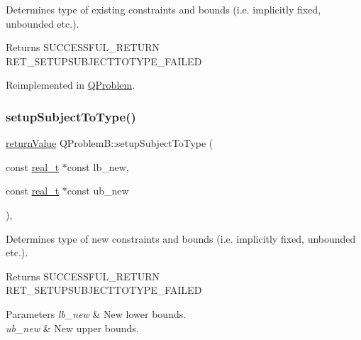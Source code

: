 Determines type of existing constraints and bounds (i.\+e. implicitly fixed, unbounded etc.). \begin{DoxyReturn}{Returns}
S\+U\+C\+C\+E\+S\+S\+F\+U\+L\+\_\+\+R\+E\+T\+U\+RN ~\newline
 R\+E\+T\+\_\+\+S\+E\+T\+U\+P\+S\+U\+B\+J\+E\+C\+T\+T\+O\+T\+Y\+P\+E\+\_\+\+F\+A\+I\+L\+ED 
\end{DoxyReturn}


Reimplemented in \hyperlink{class_q_problem_af024ebec53f988671f24ee98e71394a1}{Q\+Problem}.

\mbox{\label{class_q_problem_b_a9b170181bd826023ce43c3df3ff463e7}} 
\subsubsection{\texorpdfstring{setup\+Subject\+To\+Type()}{setupSubjectToType()}\hspace{0.1cm}{\footnotesize\ttfamily [2/2]}}
{\footnotesize\ttfamily \hyperlink{_message_handling_8hpp_a81d556f613bfbabd0b1f9488c0fa865e}{return\+Value} Q\+Problem\+B\+::setup\+Subject\+To\+Type (\begin{DoxyParamCaption}\item[{const \hyperlink{qp_o_a_s_e_s__wrapper_8h_a0d00e2b3dfadee81331bbb39068570c4}{real\+\_\+t} $\ast$const}]{lb\+\_\+new,  }\item[{const \hyperlink{qp_o_a_s_e_s__wrapper_8h_a0d00e2b3dfadee81331bbb39068570c4}{real\+\_\+t} $\ast$const}]{ub\+\_\+new }\end{DoxyParamCaption})\hspace{0.3cm}{\ttfamily [protected]}, {\ttfamily [virtual]}}

Determines type of new constraints and bounds (i.\+e. implicitly fixed, unbounded etc.). \begin{DoxyReturn}{Returns}
S\+U\+C\+C\+E\+S\+S\+F\+U\+L\+\_\+\+R\+E\+T\+U\+RN ~\newline
 R\+E\+T\+\_\+\+S\+E\+T\+U\+P\+S\+U\+B\+J\+E\+C\+T\+T\+O\+T\+Y\+P\+E\+\_\+\+F\+A\+I\+L\+ED 
\end{DoxyReturn}

\begin{DoxyParams}{Parameters}
{\em lb\+\_\+new} & New lower bounds. \\
\hline
{\em ub\+\_\+new} & New upper bounds. \\
\hline
\end{DoxyParams}
\mbox{\label{class_q_problem_b_a5f878629b9339dc4a319044a27f3cdcc}} 
